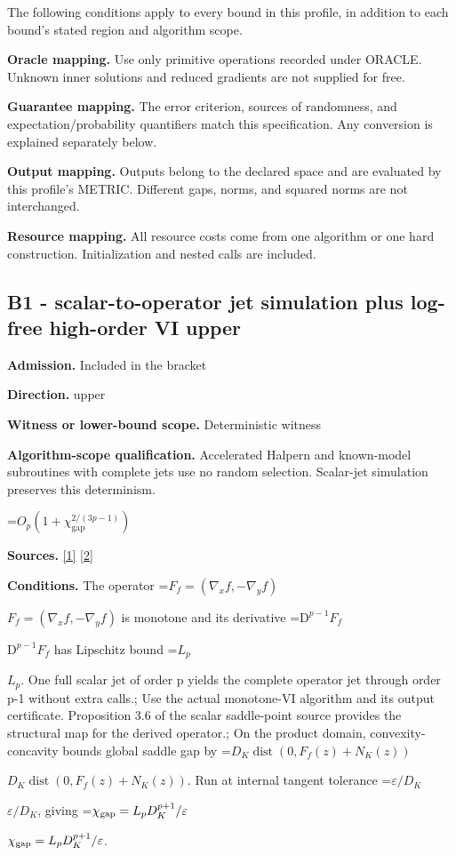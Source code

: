 \documentclass[10pt,a4paper]{article}
\newcommand{\AtlasMath}[1]{\par\begingroup\centering\setbox0=\hbox{$\displaystyle #1$}\ifdim\wd0>1.4\linewidth\typeout{ATLAS WIDE FORMULA: \the\wd0}\fi\ifdim\wd0>\linewidth\resizebox{\linewidth}{!}{\box0}\else\box0\fi\par\endgroup}
\newcommand{\AtlasInlineMath}[1]{\begingroup\setbox0=\hbox{$#1$}\ifdim\wd0>.4\linewidth\endgroup\AtlasMath{#1}\else\endgroup$#1$\fi}
\begin{document}
The following conditions apply to every bound in this profile, in addition to each bound's stated region and algorithm scope.



\textbf{Oracle mapping.} Use only primitive operations recorded under ORACLE. Unknown inner solutions and reduced gradients are not supplied for free.



\textbf{Guarantee mapping.} The error criterion, sources of randomness, and expectation/probability quantifiers match this specification. Any conversion is explained separately below.



\textbf{Output mapping.} Outputs belong to the declared space and are evaluated by this profile's METRIC. Different gaps, norms, and squared norms are not interchanged.



\textbf{Resource mapping.} All resource costs come from one algorithm or one hard construction. Initialization and nested calls are included.



\subsection{B1 - scalar-to-operator jet simulation plus log-free high-order VI upper}


\textbf{Admission.} Included in the bracket



\textbf{Direction.} upper



\textbf{Witness or lower-bound scope.} Deterministic witness



\textbf{Algorithm-scope qualification.} Accelerated Halpern and known-model subroutines with complete jets use no random selection. Scalar-jet simulation preserves this determinism.



\AtlasMath{O_p(1+\chi_{\mathrm{gap}}^{2/(3p-1)})}


\textbf{Sources.} \href{https://arxiv.org/pdf/2609.23557v1}{[1]} \href{https://arxiv.org/pdf/2609.28246v2}{[2]}



\textbf{Conditions.} The operator \AtlasInlineMath{F_f=(\nabla_xf,-\nabla_yf)} is monotone and its derivative \AtlasInlineMath{\mathrm D^{p-1}F_f} has Lipschitz bound \AtlasInlineMath{L_p}. One full scalar jet of order p yields the complete operator jet through order p-1 without extra calls.; Use the actual monotone-VI algorithm and its output certificate. Proposition 3.6 of the scalar saddle-point source provides the structural map for the derived operator.; On the product domain, convexity-concavity bounds global saddle gap by \AtlasInlineMath{D_K\operatorname{dist}(0,F_f(z)+N_K(z))}. Run at internal tangent tolerance \AtlasInlineMath{\varepsilon/D_K}, giving \AtlasInlineMath{\chi_{\rm gap}=L_pD_K^{p+1}/\varepsilon}.
\end{document}
